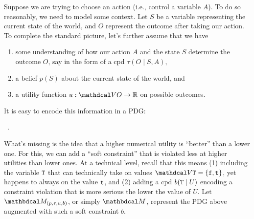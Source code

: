 \documentclass{article} %
\theoremstyle{plain}
\theoremstyle{definition}
\theoremstyle{remark}
\begin{document}
Suppose we are trying to choose an action (i.e., control a variable $A$). 
To do so reasonably, we need to model some context. 
Let $S$ be a variable representing the current state of the world,
and $O$ represent the outcome after taking our action. 
%
To complete the standard picture, let's further assume that 
we have 
\begin{enumerate}[nosep]
\item 
   some understanding of how our action $A$ and the state $S$ determine the outcome $O$, say in the form of a cpd $\tau(O \mid S,A)$, 
\item 
a belief $p(S)$ about the current state of the world,
and 
\item  a utility function $u : \V O \to \mathbb R$ on possible outcomes. 
\end{enumerate}
It is easy to encode this information in a PDG:

\begin{center}
   ~.
\end{center}

What's missing is the idea 
that a higher numerical utility is ``better'' than a lower one. 
For this, we can add a ``soft constraint'' \citep[see][\S4.2.2]{oli-dissertation} that is violated less at higher utilities than lower ones.
At a technical level, recall that this means 
(1) including the variable ${\tt T}$ that can technically take on values $\V \Tru = \{ \truf, \trut\}$, yet happens to always on the value ${\tt t}$,
and  
(2) adding a cpd $b({\tt T} \mid U)$ encoding a constraint violation that is more serious the lower the value of $U$. 
Let 
$\dg M_{(p, \tau, u, b)}$, or simply $\dg M$, 
represent the PDG above augmented with such a soft constraint $b$. 
\end{document}
